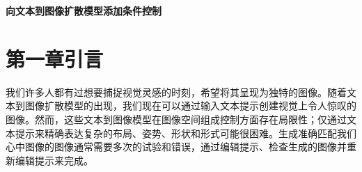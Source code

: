 \documentclass[a4paper,AutoFakeBold,oneside,12pt]{book}
\begin{document}
\begin{nopagenumber}


\newpage\backmatter
\thispagestyle{empty}



\setcounter{chapter}{0}
\renewcommand{\thefigure}{~外\arabic{chapter}-\arabic{figure}~}
\renewcommand{\theequation}{~外\arabic{chapter}-\arabic{equation}~}
\renewcommand{\thetable}{~外\arabic{chapter}-\arabic{table}~}
\renewcommand{\thelstlisting}{~外\arabic{chapter}-\arabic{lstlisting}~}

\begin{center}
\end{center}
\vspace{8mm}
\thispagestyle{empty}


\begin{center}
\sanhao\heiti\textbf{向文本到图像扩散模型添加条件控制}

\xiaosihao{}

\xiaosihao{}
\end{center}

\songti{}
\begingroup %
\let\clearpage\relax
\let\cleardoublepage\relax


\chapter*{第一章\quad{}引言}
\newtranschapter
我们许多人都有过想要捕捉视觉灵感的时刻，希望将其呈现为独特的图像。随着文本到图像扩散模型的出现，我们现在可以通过输入文本提示创建视觉上令人惊叹的图像。然而，这些文本到图像模型在图像空间组成控制方面存在局限性；仅通过文本提示来精确表达复杂的布局、姿势、形状和形式可能很困难。生成准确匹配我们心中图像的图像通常需要多次的试验和错误，通过编辑提示、检查生成的图像并重新编辑提示来完成。


\end{nopagenumber}
\end{document}
